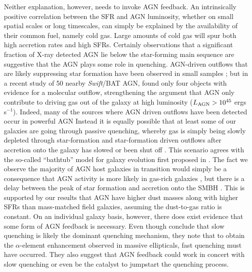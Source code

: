 \documentclass[fleqn, usenatbib]{mnras}
\newcommand{\swift}{\textit{Swift}}
\begin{document}
Neither explanation, however, needs to invoke AGN feedback. An intrinsically positive correlation between the SFR and AGN luminosity, whether on small spatial scales or long timescales, can simply be explained by the availability of their common fuel, namely cold gas. Large amounts of cold gas will spur both high accretion rates and high SFRs. Certainly observations that a significant fraction of X-ray detected AGN lie below the star-forming main sequence \citep{Shimizu:2015xo, Matsuoka:2015fk, Mullaney:2015wn} are suggestive that the AGN plays some role in quenching. AGN-driven outflows that are likely suppressing star formation have been observed in small samples \citep{Veilleux:2013qq, Cicone:2014ty, Tombesi:2015fj}; but in a recent study of 50 nearby \swift/BAT AGN, \citet{Stone:2016zl} found only four objects with evidence for a molecular outflow, strengthening the argument that AGN only contribute to driving gas out of the galaxy at high luminosity ($L_{\rm AGN} > 10^{45}$ ergs s$^{-1}$). Indeed, many of the sources where AGN driven outflows have been detected occur in powerful AGN \citep[e.g.][]{Cano-Diaz:2012en,Brusa:2015qk,Cresci:2015tk,Perna:2015rd} Instead it is equally possible that at least some of our galaxies are going through passive quenching, whereby gas is simply being slowly depleted through star-formation and star-formation driven outflows after accretion onto the galaxy has slowed or been shut off \citep{Peng:2015yg}. This scenario agrees with the so-called ``bathtub'' model for galaxy evolution first proposed in \citet{Lilly:2013pd}. The fact we observe the majority of AGN host galaxies in transition would simply be a consequence that AGN activity is more likely in gas-rich galaxies \citep{Vito:2014eu}, but there is a delay between the peak of star formation and accretion onto the SMBH \citep{Davies:2007kx, Schawinski:2014cr}. This is supported by our results that AGN have higher dust masses along with higher SFRs than mass-matched field galaxies, assuming the dust-to-gas ratio is constant. On an individual galaxy basis, however, there does exist evidence that some form of AGN feedback is necessary.  Even though \citet{Peng:2015yg} conclude that slow quenching is likely the dominant quenching mechanism, they note that to obtain the $\alpha$-element enhancement observed in massive ellipticals, fast quenching must have occurred. They also suggest that AGN feedback could work in concert with slow quenching or even be the catalyst to jumpstart the quenching process.
 
\end{document}
